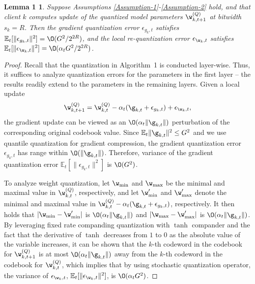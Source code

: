 \documentclass[a4paper,11pt]{article}
\begin{document}
\newtheorem*{lemma1}{Lemma 1}
\begin{lemma1}
Suppose Assumptions \ref{Assumption-1}-\ref{Assumption-2} hold, and that client $k$ computes update of the quantized model parameters $\w_{k, t+1}^{(Q)}$ at bitwidth
$s_k = R$. Then the gradient quantization error $\epsilon_{g_k, t}$ satisfies $\mathbb{E}_t[\|\epsilon_{g_k, t} \|^2] = \O(G^2/2^{2R})$, and the local re-quantization error $\epsilon_{\w_k, t}$ satisfies $\mathbb{E}_t[ \|\epsilon_{\w_k, t}\|^2] = \O(\alpha_t G^2/2^{2R})$.
\end{lemma1}

\begin{proof}
Recall that the quantization in Algorithm~1 is conducted layer-wise. Thus, it suffices to analyze quantization errors for the parameters in the first layer -- the results readily extend to the parameters in the remaining layers. Given a local update
\begin{align*}
    \w_{k, t+1}^{(Q)} = \w_{k, t}^{(Q)} - \alpha_t (\g_{k, t} + \epsilon_{g_k, t} )+ \epsilon_{\w_k, t},
\end{align*}
the gradient update can be viewed as an $\O(\alpha_t \|\g_{k, t}\|)$ perturbation of the corresponding original codebook value. Since $\mathbb{E}_t\|\g_{k, t} \|^2 \leq G^2$ and we use quantile quantization for gradient compression, the gradient quantization error $\epsilon_{g_k, t}$ has range within $\O(\|\g_{k, t}\|)$. 
Therefore, variance of the gradient quantization error $\mathbb{E}_t[\|\epsilon_{g_k, t}\|^2]$ is $\O(G^2)$. 

To analyze weight quantization, let $\w_{\min}$ and $\w_{\max}$ be the minimal and maximal value in $\w_{k, t}^{(Q)}$, respectively, and let $\w'_{\min}$ and $\w'_{\max}$ denote the minimal and maximal value in $\w_{k, t}^{(Q)} - \alpha_t (\g_{k, t} + \epsilon_{g_k, t} )$, respectively. It then holds that $| \w_{\min} - \w'_{\min} | $ is $\O(\alpha_t \|\g_{k, t}\|)$ and $| \w_{\max} - \w'_{\max} | $ is $\O(\alpha_t \|\g_{k, t}\|)$. By leveraging fixed rate companding quantization with $\tanh$ compander and the fact that the derivative of $\tanh$ decreases from $1$ to $0$ as the absolute value of the variable increases, it can be shown that the $k$-th codeword in the codebook for $\w^{(Q)}_{k, t+1}$ is at most $\O(\alpha_t \|\g_{k, t}\|)$ away from the $k$-th codeword in the codebook for $\w^{(Q)}_{k, t}$, which implies that by using stochastic quantization operator, the variance of $\epsilon_{\w_k, t}$, $\mathbb{E}_t[\|\epsilon_{\w_k, t}\|^2 ]$, is $\O(\alpha_t G^2)$.


\end{proof}
\end{document}
